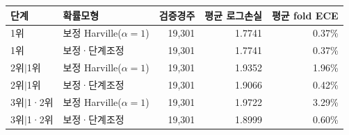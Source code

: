 \begin{tabular}{llrrr}
\toprule
단계 & 확률모형 & 검증경주 & 평균 로그손실 & 평균 fold ECE \\
\midrule
1위 & 보정 Harville($\alpha=1$) & 19,301 & 1.7741 & 0.37\% \\
1위 & 보정·단계조정 & 19,301 & 1.7741 & 0.37\% \\
2위$\mid$1위 & 보정 Harville($\alpha=1$) & 19,301 & 1.9352 & 1.96\% \\
2위$\mid$1위 & 보정·단계조정 & 19,301 & 1.9066 & 0.42\% \\
3위$\mid$1·2위 & 보정 Harville($\alpha=1$) & 19,301 & 1.9722 & 3.29\% \\
3위$\mid$1·2위 & 보정·단계조정 & 19,301 & 1.8999 & 0.60\% \\
\bottomrule
\end{tabular}
